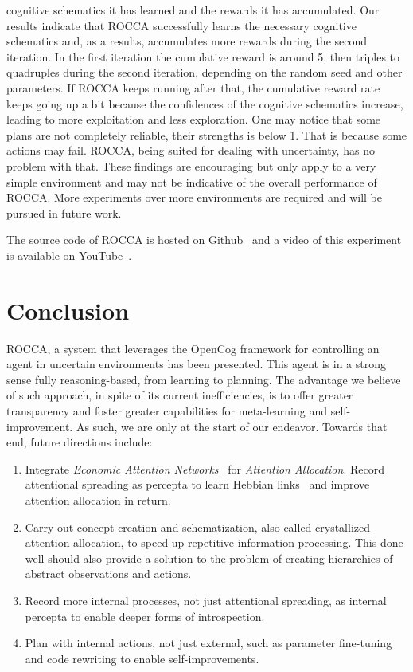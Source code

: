 \documentclass[runningheads]{llncs}
\begin{document}
cognitive schematics it has learned and the rewards it has
accumulated.  Our results indicate that ROCCA successfully learns the
necessary cognitive schematics and, as a results, accumulates more
rewards during the second iteration.  In the first iteration the
cumulative reward is around 5, then triples to quadruples during the
second iteration, depending on the random seed and other parameters.
If ROCCA keeps running after that, the cumulative reward rate keeps
going up a bit because the confidences of the cognitive schematics
increase, leading to more exploitation and less exploration.  One may
notice that some plans are not completely reliable, their strengths is
below 1.  That is because some actions may fail.  ROCCA, being suited
for dealing with uncertainty, has no problem with that.  These
findings are encouraging but only apply to a very simple environment
and may not be indicative of the overall performance of ROCCA.  More
experiments over more environments are required
and will be pursued in future work.

The source code of ROCCA is hosted on Github~\cite{ROCCACode} and a
video of this experiment is available on YouTube~\cite{ROCCADemo}.

\section{Conclusion}
\label{sec:conclusion}
ROCCA, a system that leverages the OpenCog framework for controlling
an agent in uncertain environments has been presented.  This agent is
in a strong sense fully reasoning-based, from learning to planning.
The advantage we believe of such approach, in spite of its current
inefficiencies, is to offer greater transparency and foster greater
capabilities for meta-learning and self-improvement.  As such, we are
only at the start of our endeavor.  Towards that end, future
directions include:
\begin{enumerate}
\item Integrate \emph{Economic Attention Networks}~\cite{Pitt2009} for
  \emph{Attention Allocation}.  Record attentional spreading as
  percepta to learn Hebbian links~\cite{Pitt2009} and improve
  attention allocation in return.
\item Carry out concept creation and schematization, also called
  crystallized attention allocation, to speed up repetitive
  information processing.  This done well should also provide a
  solution to the problem of creating hierarchies of abstract
  observations and actions.
\item Record more internal processes, not just attentional spreading, as
  internal percepta to enable deeper forms of introspection.
\item Plan with internal actions, not just external, such as parameter
  fine-tuning and code rewriting to enable self-improvements.
\end{enumerate}
\end{document}
